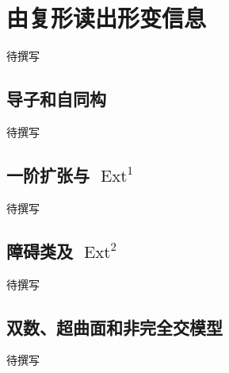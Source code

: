 
% 
% 
% 

\section{由复形读出形变信息}
\label{g5:sec:3104}

待撰写

\subsection{导子和自同构}
\label{g5:subsec:3104:01}
待撰写

\subsection{\texorpdfstring{一阶扩张与 \(\operatorname{Ext}^1\)}{一阶扩张与 Ext¹}}
\label{g5:subsec:3104:02}
待撰写

\subsection{\texorpdfstring{障碍类及 \(\operatorname{Ext}^2\)}{障碍类及 Ext²}}
\label{g5:subsec:3104:03}
待撰写

\subsection{双数、超曲面和非完全交模型}
\label{g5:subsec:3104:04}
待撰写
